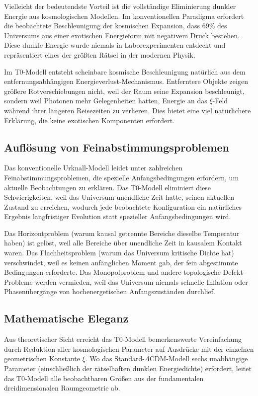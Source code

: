 \documentclass[12pt,a4paper]{article}
\begin{document}
	Vielleicht der bedeutendste Vorteil ist die vollständige Eliminierung dunkler Energie aus kosmologischen Modellen. Im konventionellen Paradigma erfordert die beobachtete Beschleunigung der kosmischen Expansion, dass 69\% des Universums aus einer exotischen Energieform mit negativem Druck bestehen. Diese dunkle Energie wurde niemals in Laborexperimenten entdeckt und repräsentiert eines der größten Rätsel in der modernen Physik.
	
	Im T0-Modell entsteht scheinbare kosmische Beschleunigung natürlich aus dem entfernungsabhängigen Energieverlust-Mechanismus. Entferntere Objekte zeigen größere Rotverschiebungen nicht, weil der Raum seine Expansion beschleunigt, sondern weil Photonen mehr Gelegenheiten hatten, Energie an das $\xi$-Feld während ihrer längeren Reisezeiten zu verlieren. Dies bietet eine viel natürlichere Erklärung, die keine exotischen Komponenten erfordert.
	
	\subsection{Auflösung von Feinabstimmungsproblemen}
	
	Das konventionelle Urknall-Modell leidet unter zahlreichen Feinabstimmungsproblemen, die spezielle Anfangsbedingungen erfordern, um aktuelle Beobachtungen zu erklären. Das T0-Modell eliminiert diese Schwierigkeiten, weil das Universum unendliche Zeit hatte, seinen aktuellen Zustand zu erreichen, wodurch jede beobachtete Konfiguration ein natürliches Ergebnis langfristiger Evolution statt spezieller Anfangsbedingungen wird.
	
	Das Horizontproblem (warum kausal getrennte Bereiche dieselbe Temperatur haben) ist gelöst, weil alle Bereiche über unendliche Zeit in kausalem Kontakt waren. Das Flachheitsproblem (warum das Universum kritische Dichte hat) verschwindet, weil es keinen anfänglichen Moment gab, der fein abgestimmte Bedingungen erforderte. Das Monopolproblem und andere topologische Defekt-Probleme werden vermieden, weil das Universum niemals schnelle Inflation oder Phasenübergänge von hochenergetischen Anfangszuständen durchlief.
	
	\subsection{Mathematische Eleganz}
	
	Aus theoretischer Sicht erreicht das T0-Modell bemerkenswerte Vereinfachung durch Reduktion aller kosmologischen Parameter auf Ausdrücke mit der einzelnen geometrischen Konstante $\xi$. Wo das Standard-$\Lambda$CDM-Modell sechs unabhängige Parameter (einschließlich der rätselhaften dunklen Energiedichte) erfordert, leitet das T0-Modell alle beobachtbaren Größen aus der fundamentalen dreidimensionalen Raumgeometrie ab.
	
\end{document}
